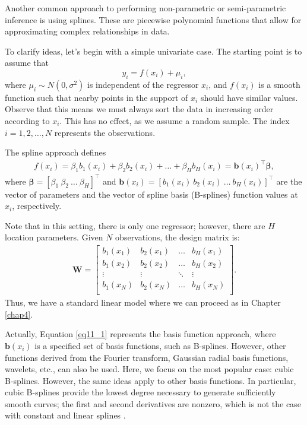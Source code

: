 Another common approach to performing non-parametric or semi-parametric inference is using splines. These are piecewise polynomial functions that allow for approximating complex relationships in data.
  
To clarify ideas, let's begin with a simple univariate case. The starting point is to assume that  
\[
y_i = f(x_{i}) + \mu_i,
\]  
where \(\mu_i \sim N(0, \sigma^2)\) is independent of the regressor \(x_{i}\), and \(f(x_{i})\) is a smooth function such that nearby points in the support of \(x_{i}\) should have similar values. Observe that this means we must always sort the data in increasing order according to $x_i$. This has no effect, as we assume a random sample. The index \(i = 1,2,\dots, N\) represents the observations.   

The spline approach defines  
\begin{align}\label{eq11_1}
	f(x_{i}) = \beta_{1}b_1(x_{i}) + \beta_{2}b_2(x_{i}) + \dots + \beta_{H}b_H(x_{i}) = \boldsymbol{b}(x_{i})^{\top}\boldsymbol{\beta},
\end{align}  
where \(\boldsymbol{\beta} = [\beta_{1} \ \beta_{2} \ \dots \ \beta_{H}]^{\top}\) and \(\boldsymbol{b}(x_{i}) = [b_1(x_{i}) \ b_2(x_{i}) \ \dots \ b_H(x_{i})]^{\top}\) are the vector of parameters and the vector of spline basis (B-splines) function values at \(x_{i}\), respectively.  

Note that in this setting, there is only one regressor; however, there are \(H\) location parameters. Given \(N\) observations, the design matrix is:
\begin{align*}
	\boldsymbol{W}=\begin{bmatrix}
		b_1(x_{1}) & b_2(x_{1}) & \dots & b_H(x_{1})\\
		b_1(x_{2}) & b_2(x_{2}) & \dots & b_H(x_{2})\\
		\vdots & \vdots & \ddots & \vdots \\
		b_1(x_{N}) & b_2(x_{N}) & \dots & b_H(x_{N})\\
	\end{bmatrix}.
\end{align*} 
Thus, we have a standard linear model where we can proceed as in Chapter \ref{chap4}.

Actually, Equation \ref{eq11_1} represents the basis function approach, where \(\boldsymbol{b}(x_{i})\) is a specified set of basis functions, such as B-splines. However, other functions derived from the Fourier transform, Gaussian radial basis functions, wavelets, etc., can also be used. Here, we focus on the most popular case: cubic B-splines. However, the same ideas apply to other basis functions. In particular, cubic B-splines provide the lowest degree necessary to generate sufficiently smooth curves; the first and second derivatives are nonzero, which is not the case with constant and linear splines \cite{BMCP2021}.  

